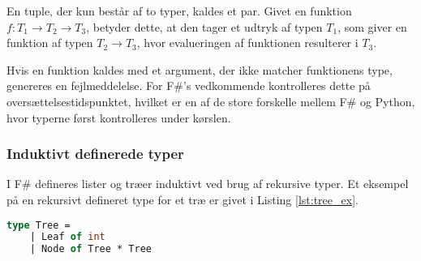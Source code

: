 


En tuple, der kun består af to typer, kaldes et par. Givet en funktion $f: T_1 \rightarrow T_2 \rightarrow T_3$, betyder dette, at den tager et udtryk af typen $T_1$, som giver en funktion af typen $T_2 \rightarrow T_3$, hvor evalueringen af funktionen resulterer i $T_3$.

Hvis en funktion kaldes med et argument, der ikke matcher funktionens type, genereres en fejlmeddelelse. For F\#'s vedkommende kontrolleres dette på oversættelsestidspunktet, hvilket er en af de store forskelle mellem F\# og Python, hvor typerne først kontrolleres under kørslen.

\subsubsection{Induktivt definerede typer}
I F\# defineres lister og træer induktivt ved brug af rekursive typer. Et eksempel på en rekursivt defineret type for et træ er givet i Listing \ref{lst:tree_ex}.

\begin{lstlisting}[language={FSharp}, label={lst:tree_ex}, caption={Eksempel på en rekursivt defineret type for et træ i F\#}]
type Tree = 
    | Leaf of int
    | Node of Tree * Tree
\end{lstlisting}

